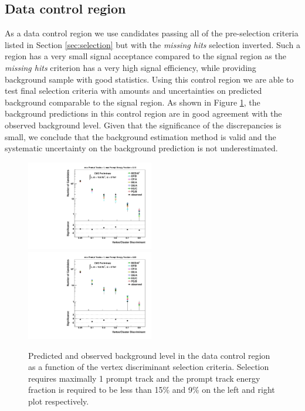 \subsection{Data control region}
\label{subsec:bkgCtrl}

As a data control region we use candidates passing all of the pre-selection criteria listed in Section
 \ref{sec:selection} but with the {\it missing hits} selection inverted. Such a region has a very small 
signal acceptance compared to the signal region as the {\it missing hits} criterion has a very high signal 
efficiency, while providing
background sample with good statistics. Using this control region we are able to test final selection
criteria with amounts and uncertainties on predicted background comparable to the signal region. 
 As shown in Figure \ref{fig:bkg_NMiss}, 
the background predictions in this control region are in good agreement 
with the observed background level. Given that the significance
of the discrepancies is small, we conclude
that the background estimation method is valid and the systematic uncertainty on the background
 prediction is not underestimated.

\begin{figure}[htbp]
\centering
\includegraphics[width=0.495\textwidth]{plots/background/bkg_NMiss1.pdf}
\includegraphics[width=0.495\textwidth]{plots/background/bkg_NMiss2.pdf}
\caption{Predicted and observed background level in the data control region as a function of the vertex
discriminant selection criteria. Selection requires maximally 1 prompt track and the prompt track energy fraction
is required to be less than 15\% and 9\% on the left and right plot respectively.\label{fig:bkg_NMiss}}
\end{figure}


